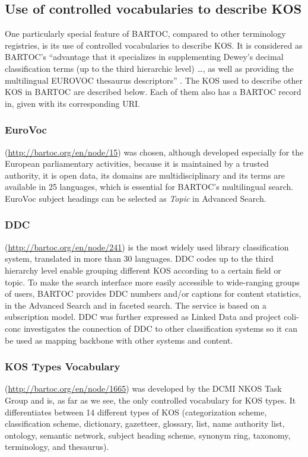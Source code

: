 \documentclass[12pt,a4paper]{llncs}
\begin{document}
\subsection{Use of controlled vocabularies to describe KOS}
One particularly special feature of BARTOC, compared to other terminology registries, is its use of controlled vocabularies to describe KOS. It is considered as BARTOC's ``advantage that it specializes in supplementing Dewey’s decimal classification terms (up to the third hierarchic level) \ldots, as well as providing the multilingual EUROVOC thesaurus descriptors'' \cite{bratkova2014revue}. The KOS used to describe other KOS in BARTOC are described below. Each of them also has a BARTOC record in, given with its corresponding URI. 

\subsubsection{EuroVoc}
(\href{http://bartoc.org/en/node/15}{http://bartoc.org/en/node/15}) was chosen, although developed especially for the European parliamentary activities, because it is maintained by a trusted authority, it is open data, its domains are multidisciplinary and its terms are available in 25 languages, which is essential for BARTOC's multilingual search. EuroVoc subject headings can be selected as \textit{Topic} in Advanced Search. 

\subsubsection{DDC}
(\href{http://bartoc.org/en/node/241}{http://bartoc.org/en/node/241})
is the most widely used library classification system, translated in more than 30 languages. DDC codes up to the third hierarchy level enable grouping different KOS according to a certain field or topic. To make the search interface more easily accessible to wide-ranging groups of users, BARTOC provides DDC numbers and/or captions for content statistics, in the Advanced Search and in faceted search. The service is based on a subscription model. DDC was further expressed as Linked Data \cite{panzer2013dewey} and project coli-conc investigates the connection of DDC to other classification systems so it can be used as mapping backbone with other systems and content.

\subsubsection{KOS Types Vocabulary}
(\href{http://bartoc.org/en/node/1665}{http://bartoc.org/en/node/1665})
was developed by the DCMI NKOS Task Group \cite{KOSTypes} and is, as far as we see, the only controlled vocabulary for KOS types. It differentiates between 14 different types of KOS (categorization scheme, classification scheme, dictionary, gazetteer, glossary, list, name authority list, ontology, semantic network, subject heading scheme, synonym ring, taxonomy, terminology, and thesaurus).
\end{document}
